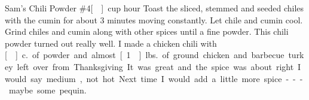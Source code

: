 \begin{recipe}{Sam's Chili Powder \#4}{\unit[]{cup}}{ hour}
Toast the sliced, stemmed and seeded chiles with the cumin for about 3 minutes moving constantly.  Let chile and cumin cool.
Grind chiles and cumin along with other spices until a fine powder.
\freeform This chili powder turned out really well.  I made a chicken chili with \unit[]{c.} of powder and almost \unit[1]{lbs.} of ground chicken and barbecue turkey left over from Thanksgiving.  It was great and the spice was about right.  I would say medium, not hot.  Next time I would add a little more spice --- maybe some pequin.
\end{recipe}

